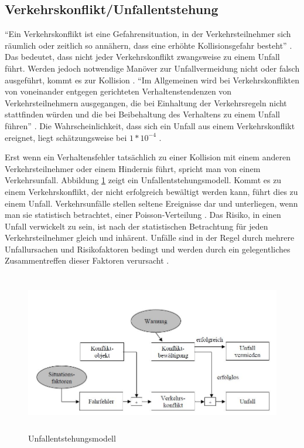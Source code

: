 \subsection{Verkehrskonflikt/Unfallentstehung}
\enquote{Ein Verkehrskonflikt ist eine Gefahrensituation, in der Verkehrsteilnehmer sich räumlich oder zeitlich so annähern, dass eine erhöhte Kollisionsgefahr besteht} \parencite[S. 26]{Erke.1978}. Das bedeutet, dass nicht jeder Verkehrskonflikt zwangsweise zu einem Unfall führt. Werden jedoch notwendige Manöver zur Unfallvermeidung nicht oder falsch ausgeführt, kommt es zur Kollision \parencite[S. 43]{Fricke.2006}. \enquote{Im Allgemeinen wird bei Verkehrskonflikten von voneinander entgegen gerichteten Verhaltenstendenzen von Verkehrsteilnehmern ausgegangen, die bei Einhaltung der Verkehrsregeln nicht stattfinden würden und die bei Beibehaltung des Verhaltens zu einem Unfall führen} \parencite[S. 10]{Hoffmann.26.04.2013}. Die Wahrscheinlichkeit, dass sich ein Unfall aus einem Verkehrskonflikt ereignet, liegt schätzungsweise bei $1\ast 10^{-4}$ \parencite[S. 99]{Reichart.2001}.

Erst wenn ein Verhaltensfehler tatsächlich zu einer Kollision mit einem anderen Verkehrsteilnehmer oder einem Hindernis führt, spricht man von einem Verkehrsunfall. Abbildung \ref{fig:Unfallentstehung} zeigt ein Unfallentstehungsmodell. Kommt es zu einem Verkehrskonflikt, der nicht erfolgreich bewältigt werden kann, führt dies zu einem Unfall. Verkehrsunfälle stellen seltene Ereignisse dar und unterliegen, wenn man sie statistisch betrachtet, einer Poisson-Verteilung \parencite[S. 18]{Grundl.2005}. Das Risiko, in einen Unfall verwickelt zu sein, ist nach der statistischen Betrachtung für jeden Verkehrsteilnehmer gleich und inhärent. Unfälle sind in der Regel durch mehrere Unfallursachen und Risikofaktoren bedingt und werden durch ein gelegentliches Zusammentreffen dieser Faktoren verursacht \parencite[S. 20]{Grundl.2005}.

\begin{savenotes}
	\begin{figure}[H]
		\centering
		\includegraphics[width=14cm,height=7cm]{figures/Unfallentstehung}
		\caption[Unfallentstehungsmodell]{Unfallentstehungsmodell \parencite[S. 44]{Fricke.2006}}\label{fig:Unfallentstehung}
	\end{figure}
\end{savenotes}


